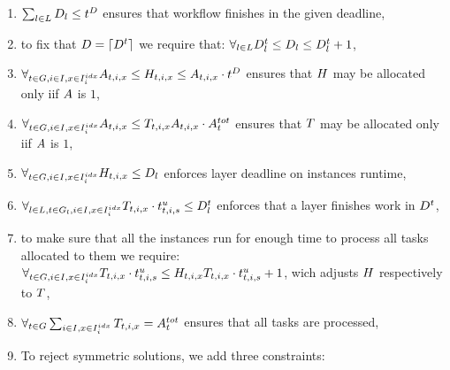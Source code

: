 {    
    \begin{enumerate}
        \item $\sum_{l \in L}  D_l \leq t^D$ ensures that workflow finishes in the given deadline,
        \item to fix that $D = \lceil D^t\rceil$ we require that: $\forall_{l \in L}  D^t_l \leq D_l \leq D^t_l + 1$,
        \item $\forall_{t \in G, i \in I, x \in I^{idx}_i}  A_{t,i,x} \leq H_{t,i,x} \leq  A_{t,i,x} \cdot t^D $ ensures that $H$ may be allocated only iif $A$ is $1$,
        \item $\forall_{t \in G, i \in I, x \in I^{idx}_i} 
         A_{t,i,x} \leq T_{t,i,x} A_{t,i,x} \cdot A^{tot}_t$ ensures that $T$ may be allocated only iif $A$ is $1$,
        \item $\forall_{t \in G, i \in I, x \in I^{idx}_i} 
         H_{t,i,x} \leq D_l$ enforces layer deadline on instances runtime,
        \item $\forall_{l \in L, t \in G_l, i \in I, x \in I^{idx}_i} 
         T_{t,i,x} \cdot t^u_{t,i,s} \leq D^t_l$ enforces that a layer finishes work in $D^t$,
        \item to make sure that all the instances run for enough time to process all tasks allocated to them we require: $\forall_{t \in G, i \in I, x \in I^{idx}_i} 
         T_{t,i,x} \cdot t^u_{t,i,s} \leq H_{t,i,x} T_{t,i,x} \cdot t^u_{t,i,s} + 1$, wich  adjusts $H$ respectively to $T$,
        \item $\forall_{t \in G} 
         \sum_{i \in I, x \in I^{idx}_i} T_{t,i,x} = A^{tot}_t$ ensures that all tasks are processed,
        \item To reject symmetric solutions, we add three constraints:
\end{enumerate}}
